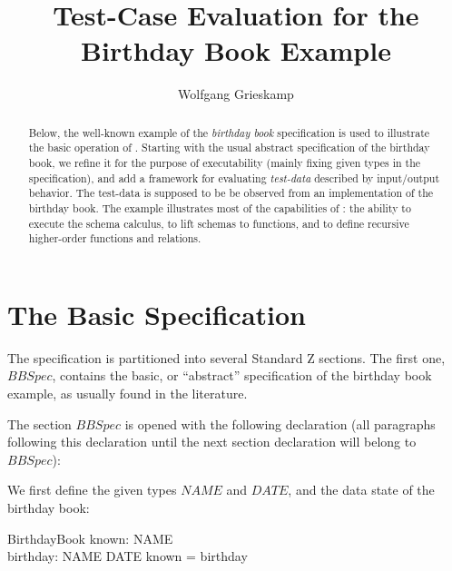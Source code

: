 \documentclass{article}
\begin{document}
\author{Wolfgang Grieskamp}
\title{Test-Case Evaluation for the Birthday Book Example}
\maketitle
\begin{abstract}

Below, the well-known example of the \emph{birthday book}
specification is used to illustrate the basic operation of \ZAP.
Starting with the usual abstract specification of the birthday book,
we refine it for the purpose of executability (mainly fixing given
types in the specification), and add a framework for evaluating
\emph{test-data} described by input/output behavior.
The test-data is supposed to be be observed from an
implementation of the birthday book. The example illustrates most
of the capabilities of \ZAP{}: the ability to execute the schema
calculus, to lift schemas to functions, and to define recursive
higher-order functions and relations. 

\end{abstract}




\section{The Basic Specification}

The specification is partitioned into several Standard Z sections. The
first one, $BBSpec$, contains the basic, or ``abstract'' specification
of the birthday book example, as usually found in the literature.

The section $BBSpec$ is opened with the following declaration (all
paragraphs following this declaration until the next section
declaration will belong to $BBSpec$):

\begin{zdirectives} %
\end{zdirectives}

We first define the given types $NAME$ and $DATE$, and the data
state of the birthday book:

\begin{zedgroup} %

\begin{zed}
\end{zed}

\begin{schema}{BirthdayBook}
  known: \power NAME \\
  birthday: NAME \pfun DATE
\where
  known = \dom birthday
\end{schema}

\end{zedgroup}
\end{document}
